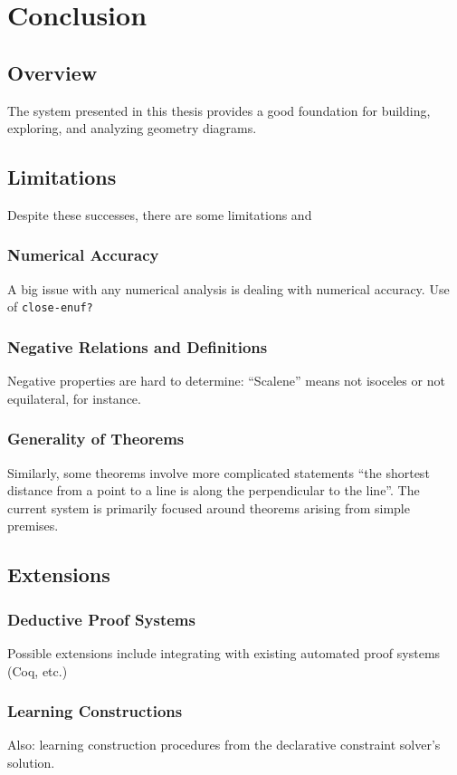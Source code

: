 \chapter{Conclusion}
\label{chap:conclusion}

\section{Overview}

The system presented in this thesis provides a good foundation for
building, exploring, and analyzing geometry diagrams.

\section{Limitations}

Despite these successes, there are some limitations and

\subsection{Numerical Accuracy}

A big issue with any numerical analysis is dealing with numerical
accuracy. Use of \texttt{close-enuf?}

\subsection{Negative Relations and Definitions}

Negative properties are hard to determine: ``Scalene'' means not
isoceles or not equilateral, for instance.

\subsection{Generality of Theorems}

Similarly, some theorems involve more complicated statements ``the
shortest distance from a point to a line is along the perpendicular to
the line''. The current system is primarily focused around theorems
arising from simple premises.

\section{Extensions}

\subsection{Deductive Proof Systems}

Possible extensions include integrating with existing automated proof
systems (Coq, etc.)

\subsection{Learning Constructions}

Also: learning construction procedures from the declarative constraint
solver's solution.
